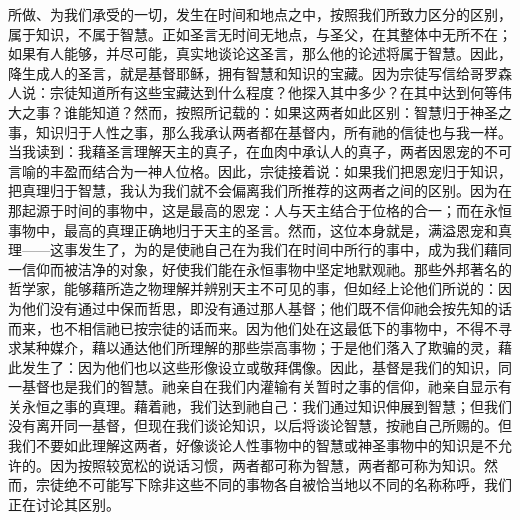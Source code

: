 所做、为我们承受的一切，发生在时间和地点之中，按照我们所致力区分的区别，属于知识，不属于智慧。正如圣言无时间无地点，与圣父，在其整体中无所不在；如果有人能够，并尽可能，真实地谈论这圣言，那么他的论述将属于智慧。因此，降生成人的圣言，就是基督耶稣，拥有智慧和知识的宝藏。因为宗徒写信给哥罗森人说：宗徒知道所有这些宝藏达到什么程度？他探入其中多少？在其中达到何等伟大之事？谁能知道？然而，按照所记载的：如果这两者如此区别：智慧归于神圣之事，知识归于人性之事，那么我承认两者都在基督内，所有祂的信徒也与我一样。当我读到：我藉圣言理解天主的真子，在血肉中承认人的真子，两者因恩宠的不可言喻的丰盈而结合为一神人位格。因此，宗徒接着说：如果我们把恩宠归于知识，把真理归于智慧，我认为我们就不会偏离我们所推荐的这两者之间的区别。因为在那起源于时间的事物中，这是最高的恩宠：人与天主结合于位格的合一；而在永恒事物中，最高的真理正确地归于天主的圣言。然而，这位本身就是，满溢恩宠和真理——这事发生了，为的是使祂自己在为我们在时间中所行的事中，成为我们藉同一信仰而被洁净的对象，好使我们能在永恒事物中坚定地默观祂。那些外邦著名的哲学家，能够藉所造之物理解并辨别天主不可见的事，但如经上论他们所说的：因为他们没有通过中保而哲思，即没有通过那人基督；他们既不信仰祂会按先知的话而来，也不相信祂已按宗徒的话而来。因为他们处在这最低下的事物中，不得不寻求某种媒介，藉以通达他们所理解的那些崇高事物；于是他们落入了欺骗的灵，藉此发生了：因为他们也以这些形像设立或敬拜偶像。因此，基督是我们的知识，同一基督也是我们的智慧。祂亲自在我们内灌输有关暂时之事的信仰，祂亲自显示有关永恒之事的真理。藉着祂，我们达到祂自己：我们通过知识伸展到智慧；但我们没有离开同一基督，但现在我们谈论知识，以后将谈论智慧，按祂自己所赐的。但我们不要如此理解这两者，好像谈论人性事物中的智慧或神圣事物中的知识是不允许的。因为按照较宽松的说话习惯，两者都可称为智慧，两者都可称为知识。然而，宗徒绝不可能写下除非这些不同的事物各自被恰当地以不同的名称称呼，我们正在讨论其区别。\par

